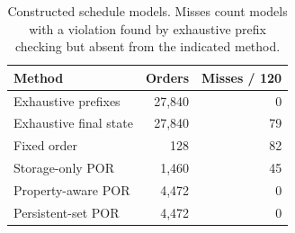 \begin{table}[t]\centering\small
\caption{Constructed schedule models. Misses count models with a violation found by exhaustive prefix checking but absent from the indicated method.}
\label{tab:schedule}
\begin{tabular}{@{}lrr@{}}\toprule
Method & Orders & Misses / 120 \\ \midrule
Exhaustive prefixes & 27,840 & 0 \\
Exhaustive final state & 27,840 & 79 \\
Fixed order & 128 & 82 \\
Storage-only POR & 1,460 & 45 \\
Property-aware POR & 4,472 & 0 \\
Persistent-set POR & 4,472 & 0 \\
\bottomrule\end{tabular}\end{table}
